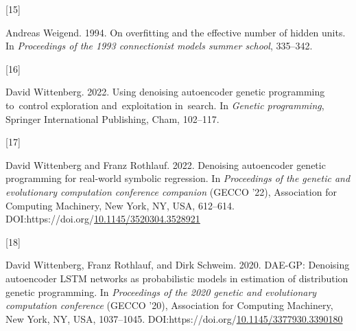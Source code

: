 \documentclass[
  11pt,
]{article}
\newlength{\cslhangindent}
\newlength{\csllabelwidth}
\newlength{\cslentryspacingunit} %
\newenvironment{CSLReferences}[2] %
 {%
  \setlength{\parindent}{0pt}
  \ifodd #1
  \let\oldpar\par
  \def\par{\hangindent=\cslhangindent\oldpar}
  \fi
  \setlength{\parskip}{#2\cslentryspacingunit}
 }%
 {}
\newcommand{\CSLLeftMargin}[1]{\parbox[t]{\csllabelwidth}{#1}}
\newcommand{\CSLRightInline}[1]{\parbox[t]{\linewidth - \csllabelwidth}{#1}\break}
\begin{document}
\begin{CSLReferences}{0}{0}
\leavevmode{}%
\CSLLeftMargin{{[}15{]} }%
\CSLRightInline{Andreas Weigend. 1994. On overfitting and the effective number of hidden units. In \emph{Proceedings of the 1993 connectionist models summer school}, 335--342.}

\leavevmode{}%
\CSLLeftMargin{{[}16{]} }%
\CSLRightInline{David Wittenberg. 2022. Using denoising autoencoder genetic programming to~control exploration and~exploitation in~search. In \emph{Genetic programming}, Springer International Publishing, Cham, 102--117.}

\leavevmode{}%
\CSLLeftMargin{{[}17{]} }%
\CSLRightInline{David Wittenberg and Franz Rothlauf. 2022. Denoising autoencoder genetic programming for real-world symbolic regression. In \emph{Proceedings of the genetic and evolutionary computation conference companion} (GECCO '22), Association for Computing Machinery, New York, NY, USA, 612--614. DOI:https://doi.org/\href{https://doi.org/10.1145/3520304.3528921}{10.1145/3520304.3528921}}

\leavevmode{}%
\CSLLeftMargin{{[}18{]} }%
\CSLRightInline{David Wittenberg, Franz Rothlauf, and Dirk Schweim. 2020. DAE-GP: Denoising autoencoder LSTM networks as probabilistic models in estimation of distribution genetic programming. In \emph{Proceedings of the 2020 genetic and evolutionary computation conference} (GECCO '20), Association for Computing Machinery, New York, NY, USA, 1037--1045. DOI:https://doi.org/\href{https://doi.org/10.1145/3377930.3390180}{10.1145/3377930.3390180}}

\end{CSLReferences}
\end{document}

